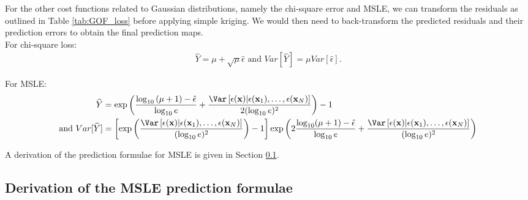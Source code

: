 \documentclass[a4paper,fleqn]{cas-sc}
\begin{document}
For the other cost functions related to Gaussian distributions, namely the chi-square error and MSLE, we can transform the residuals as outlined in Table \ref{tab:GOF_loss} before applying simple kriging. We would then need to back-transform the predicted residuals and their prediction errors to obtain the final prediction maps. 
\\
For chi-square loss:
\begin{gather}
\widehat{Y} = \mu + \sqrt{\mu}\hat{\epsilon} \text{ and }
Var[\widehat{Y}] = \mu Var[\hat{\epsilon}]. \label{eqn:chisquarebt}
\end{gather}

For MSLE:
\begin{align}
\widehat{Y} &= \exp\left(\frac{\log_{10}\left(\mu + 1\right) - \hat{\epsilon}}{\log_{10}e} + \frac{\Var\left[\epsilon(\mathbf{x})|\epsilon(\mathbf{x}_{1}), 
    \dots, \epsilon(\mathbf{x}_{N})\right]}{2(\log_{10}e)^2}\right) - 1 \label{eqn:mslbt1} \\
\text{and } Var[\widehat{Y}] &= \left[\exp\left(\frac{\Var\left[\epsilon(\mathbf{x})|\epsilon(\mathbf{x}_{1}), 
    \dots, \epsilon(\mathbf{x}_{N})\right]}{(\log_{10}e)^2}\right) - 1\right]\exp\left(2\frac{\log_{10}(\mu + 1) - \hat{\epsilon}}{\log_{10}e} + \frac{\Var\left[\epsilon(\mathbf{x})|\epsilon(\mathbf{x}_{1}), 
    \dots, \epsilon(\mathbf{x}_{N})\right]}{(\log_{10}e)^2}\right) \label{eqn:mslbt2}
\end{align}

A derivation of the prediction formulae for MSLE is given in Section \ref{supp-c-msle}.

\subsection{Derivation of the MSLE prediction formulae} \label{supp-c-msle}
\end{document}

